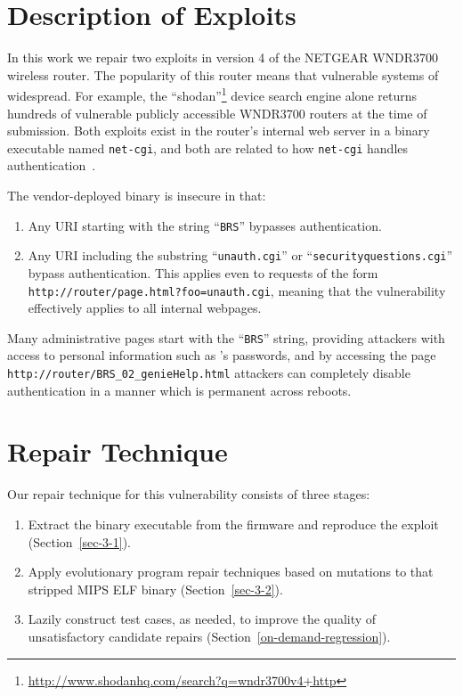 \documentclass{sigcomm-alternate}
\begin{document}
\section{Description of Exploits}
\label{sec-2}
In this work we repair two exploits in version 4 of the NETGEAR WNDR3700
wireless router. The popularity of this router means that vulnerable
systems of widespread. For example, the
``shodan''\footnote{\url{http://www.shodanhq.com/search?q=wndr3700v4+http}}
device search engine alone returns hundreds of vulnerable publicly
accessible WNDR3700 routers at the time of submission. 
Both exploits exist in the router's internal web server in a binary
executable named \texttt{net-cgi}, and both are related to how
\texttt{net-cgi} handles authentication~\cite{zcutlip}.

The vendor-deployed binary is insecure in that: 
\begin{enumerate}
\item Any URI starting with the string ``{\tt BRS}'' bypasses authentication.

\item Any URI including the substring ``{\tt unauth.cgi}'' or
  ``{\tt securityquestions.cgi}'' bypass authentication. This applies
  even to requests of the form 
  \texttt{http://router/page.html?foo=unauth.cgi}, meaning that 
  the vulnerability effectively applies to all internal webpages. 
\end{enumerate}

Many administrative pages start with the ``{\tt BRS}'' string, providing
attackers with access to personal information such as 's
passwords, and by accessing the page
\texttt{http://router/BRS\_02\_genieHelp.html} attackers can
completely disable authentication in a manner which is permanent
across reboots.

\section{Repair Technique}
\label{sec-3}

Our repair technique for this vulnerability consists of three stages:
\begin{enumerate}
\item Extract the binary executable from the firmware and reproduce
the exploit (Section~\ref{sec-3-1}).
\item Apply evolutionary program repair techniques based on mutations to
that stripped MIPS ELF binary (Section~\ref{sec-3-2}). 
\item Lazily construct test cases, as needed, to improve the quality of
unsatisfactory candidate repairs (Section~\ref{on-demand-regression}). 
\end{enumerate} 
\end{document}
